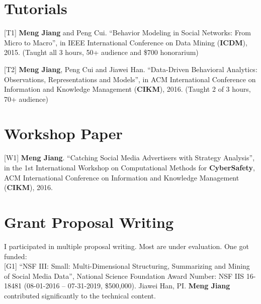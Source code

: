 \documentclass[margin, 10pt]{res}
\begin{document}
\begin{resume}

\section{Tutorials}

[T1] \textbf{Meng Jiang} and Peng Cui. ``Behavior Modeling in Social Networks: From Micro to Macro'', in IEEE International Conference on Data Mining (\textbf{ICDM}), 2015. (Taught all 3 hours, 50+ audience and \$700 honorarium)

[T2] \textbf{Meng Jiang}, Peng Cui and Jiawei Han. ``Data-Driven Behavioral Analytics: Observations, Representations and Models'', in ACM International Conference on Information and Knowledge Management (\textbf{CIKM}), 2016. (Taught 2 of 3 hours, 70+ audience)


\section{Workshop Paper}

[W1] \textbf{Meng Jiang}. ``Catching Social Media Advertisers with Strategy Analysis'', in the 1st International Workshop on Computational Methods for \textbf{CyberSafety}, ACM International Conference on Information and Knowledge Management (\textbf{CIKM}), 2016.


\section{Grant Proposal Writing}

{I participated in multiple proposal writing. Most are under evaluation. One got funded:} \\
{[G1]} ``NSF III: Small: Multi-Dimensional Structuring, Summarizing and Mining of Social Media Data'', National Science Foundation Award Number: NSF IIS 16-18481 (08-01-2016 -- 07-31-2019, \$500,000). Jiawei Han, PI. \textbf{Meng Jiang} contributed significantly to the technical content.


\end{resume}
\end{document}
